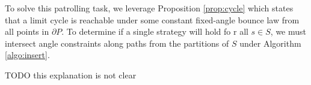 \documentclass[]{styles/svproc}  %
\begin{document}
To solve this patrolling task, we leverage Proposition \ref{prop:cycle} which
states that a limit cycle is reachable under some constant fixed-angle bounce law
from all points in $\partial P$. To determine if a single strategy will hold fo
r all $s \in S$, we must intersect angle constraints along paths from the
partitions of $S$ under Algorithm \ref{algo:insert}.

{\color{red} TODO this explanation is not clear}

%

%
%
%
%
%
%
%
%
\end{document}
